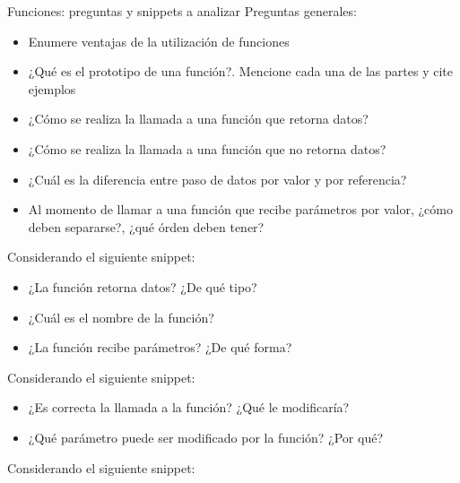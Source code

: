 \documentclass[xcolor=pdftex,table,11pt]{beamer}
\begin{document}
\begin{frame}[allowframebreaks]{Funciones: preguntas y snippets a analizar}
Preguntas generales:


\begin{itemize}
\item Enumere ventajas de la utilización de funciones
\item ¿Qué es el prototipo de una función?. Mencione cada una de las partes y cite ejemplos
\item ¿Cómo se realiza la llamada a una función que retorna datos?
\item ¿Cómo se realiza la llamada a una función que no retorna datos?\item ¿Cuál es la diferencia entre paso de datos por valor y por referencia?

\item Al momento de llamar a una función que recibe parámetros por valor, ¿cómo deben separarse?, ¿qué órden deben tener?


\end{itemize}
\newpage
Considerando el siguiente snippet:

\codesetstylefrombeamer
{}


\begin{itemize}

\item ¿La función retorna datos? ¿De qué tipo?
\item ¿Cuál es el nombre de la función? 
\item ¿La función recibe parámetros? ¿De qué forma?


\end{itemize}

\newpage
Considerando el siguiente snippet:

\codesetstylefrombeamer
{}


\begin{itemize}

\item ¿Es correcta la llamada a la función? ¿Qué le modificaría?
\item ¿Qué parámetro puede ser modificado por la función? ¿Por qué? 

\end{itemize}

\newpage
Considerando el siguiente snippet:

\codesetstylefrombeamer
{}



\end{frame}
\end{document}
